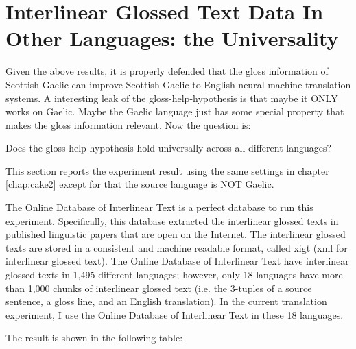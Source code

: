 \documentclass[final]{ua-thesis}
\numberwithin{equation}{section}
\begin{document}
\section{Interlinear Glossed Text Data In Other Languages: the Universality}
Given the above results, it is properly defended that the gloss information of Scottish Gaelic can improve Scottish Gaelic to English neural machine translation systems. A interesting leak of the gloss-help-hypothesis is that maybe it ONLY works on Gaelic. Maybe the Gaelic language just has some special property that makes the gloss information relevant. Now the question is:

\begin{exe}
\ex Does the gloss-help-hypothesis hold universally across all different languages?   
\end{exe}  

This section reports the experiment result using the same settings in chapter \ref{chap:cake2} except for that the source language is NOT Gaelic. 

The Online Database of Interlinear Text \citep{ODIN, Xia2016} is a perfect database to run this experiment. Specifically, this database extracted the interlinear glossed texts in published linguistic papers that are open on the Internet. The interlinear glossed texts are stored in a consistent and machine readable format, called xigt (xml for interlinear glossed text). The Online Database of Interlinear Text have interlinear glossed texts in 1,495 different languages; however, only 18 languages have more than 1,000 chunks of interlinear glossed text (i.e. the 3-tuples of a source sentence, a gloss line, and an English translation). In the current translation experiment, I use the Online Database of Interlinear Text in these 18 languages.   

The result is shown in the following table:   
\end{document}
